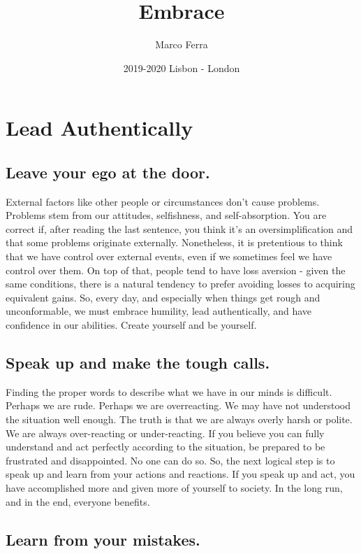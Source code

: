 \documentclass[10pt,a4paper]{book}
\title{Embrace}
\author{Marco Ferra}
\date{2019-2020 Lisbon - London}
\begin{document}
\maketitle

\tableofcontents

\chapter{Lead Authentically}

\section{Leave your ego at the door.}

External factors like other people or circumstances don't cause problems. Problems stem from our attitudes, selfishness, and self-absorption. You are correct if, after reading the last sentence, you think it's an oversimplification and that some problems originate externally. Nonetheless, it is pretentious to think that we have control over external events, even if we sometimes feel we have control over them. On top of that, people tend to have loss aversion - given the same conditions, there is a natural tendency to prefer avoiding losses to acquiring equivalent gains. So, every day, and especially when things get rough and unconformable, we must embrace humility, lead authentically, and have confidence in our abilities. Create yourself and be yourself.

\section{Speak up and make the tough calls.}

Finding the proper words to describe what we have in our minds is difficult. Perhaps we are rude. Perhaps we are overreacting. We may have not understood the situation well enough. The truth is that we are always overly harsh or polite. We are always over-reacting or under-reacting. If you believe you can fully understand and act perfectly according to the situation, be prepared to be frustrated and disappointed. No one can do so. So, the next logical step is to speak up and learn from your actions and reactions. If you speak up and act, you have accomplished more and given more of yourself to society. In the long run, and in the end, everyone benefits.

\section{Learn from your mistakes.}
\end{document}
